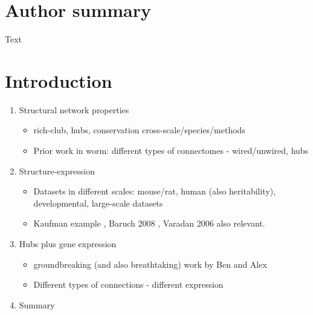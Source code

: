\documentclass[10pt,letterpaper]{article}
\begin{document}
\section*{Author summary}
Text

\linenumbers

\section*{Introduction}

\begin{enumerate}
    \item{Structural network properties}
    \begin{itemize}
    \item{rich-club, hubs, conservation cross-scale/species/methods}
    \item{Prior work in worm: different types of connectomes - wired/unwired, hubs}
    \end{itemize}

    \item{Structure-expression}
    \begin{itemize}
    \item{Datasets in different scales: mouse/rat, human (also heritability), developmental, large-scale datasets}
    \item{Kaufman example \cite{Kaufman2006}, Baruch 2008 \cite{Baruch2008b}, Varadan 2006 \cite{Varadan2006} also relevant.}
    \end{itemize}

    \item{Hubs plus gene expression}
    \begin{itemize}
    \item{groundbreaking (and also breathtaking) work by Ben and Alex \cite{Fulcher2015}}
    \item{Different types of connections - different expression}
    \end{itemize}
    \item{Summary}

 \end{enumerate}
\end{document}
